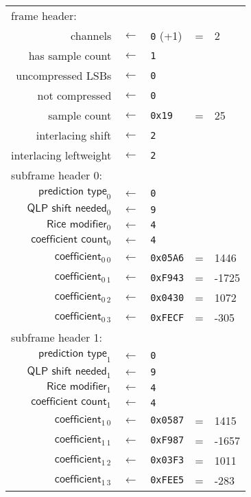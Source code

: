 \begin{table}[h]
{
\begin{tabular}{rclcl}
\multicolumn{5}{l}{frame header:} \\
\textsf{channels} & $\leftarrow$ & \texttt{0} (+1) &=& 2 \\
\textsf{has sample count} & $\leftarrow$ & \texttt{1} \\
\textsf{uncompressed LSBs} & $\leftarrow$ & \texttt{0} \\
\textsf{not compressed} & $\leftarrow$ & \texttt{0} \\
\textsf{sample count} & $\leftarrow$ & \texttt{0x19} &=& 25 \\
\textsf{interlacing shift} & $\leftarrow$ & \texttt{2} \\
\textsf{interlacing leftweight} & $\leftarrow$ & \texttt{2} \\
\hline
\multicolumn{5}{l}{subframe header 0:} \\
$\textsf{prediction type}_0$ & $\leftarrow$ & \texttt{0} \\
$\textsf{QLP shift needed}_0$ & $\leftarrow$ & \texttt{9} \\
$\textsf{Rice modifier}_0$ & $\leftarrow$ & \texttt{4} \\
$\textsf{coefficient count}_0$ & $\leftarrow$ & \texttt{4} \\
$\textsf{coefficient}_{0~0}$ & $\leftarrow$ & \texttt{0x05A6} &=& 1446 \\
$\textsf{coefficient}_{0~1}$ & $\leftarrow$ & \texttt{0xF943} &=& -1725 \\
$\textsf{coefficient}_{0~2}$ & $\leftarrow$ & \texttt{0x0430} &=& 1072 \\
$\textsf{coefficient}_{0~3}$ & $\leftarrow$ & \texttt{0xFECF} &=& -305 \\
\hline
\multicolumn{5}{l}{subframe header 1:} \\
$\textsf{prediction type}_1$ & $\leftarrow$ & \texttt{0} \\
$\textsf{QLP shift needed}_1$ & $\leftarrow$ & \texttt{9} \\
$\textsf{Rice modifier}_1$ & $\leftarrow$ & \texttt{4} \\
$\textsf{coefficient count}_1$ & $\leftarrow$ & \texttt{4} \\
$\textsf{coefficient}_{1~0}$ & $\leftarrow$ & \texttt{0x0587} &=& 1415 \\
$\textsf{coefficient}_{1~1}$ & $\leftarrow$ & \texttt{0xF987} &=& -1657 \\
$\textsf{coefficient}_{1~2}$ & $\leftarrow$ & \texttt{0x03F3} &=& 1011 \\
$\textsf{coefficient}_{1~3}$ & $\leftarrow$ & \texttt{0xFEE5} &=& -283 \\
\end{tabular}
}
\end{table}

